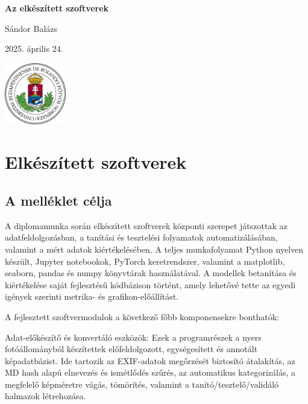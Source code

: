 \documentclass[	
  noindent
]{elteikthesis}[2024/04/26]
\begin{document}

\begin{titlepage}
    \centering
    \vspace*{3cm}
    {\Huge\bfseries Az elkészített szoftverek \par}
    \vspace{2cm}
    {\Large Sándor Balázs\par}
    \vspace{1cm}
    {\large 2025. április 24. \par}
    \vfill
    {\includegraphics[width=0.2\textwidth]{images/elte_cimer_szines.eps}\par}
\end{titlepage}

\tableofcontents

\chapter{Elkészített szoftverek}

    \section{A melléklet célja}
    A diplomamunka során elkészített szoftverek központi szerepet játszottak az adatfeldolgozásban, a tanítási és tesztelési folyamatok automatizálásában, valamint a mért adatok kiértékelésében. A teljes munkafolyamat Python nyelven készült, Jupyter notebookok, PyTorch keretrendszer, valamint a matplotlib, seaborn, pandas és numpy könyvtárak használatával. A modellek betanítása és kiértékelése saját fejlesztésű kódbázison történt, amely lehetővé tette az egyedi igények szerinti metrika- és grafikon-előállítást.

    A fejlesztett szoftvermodulok a következő főbb komponensekre bonthatók:

        Adat-előkészítő és konvertáló eszközök: Ezek a programrészek a nyers fotóállományból készítettek előfeldolgozott, egységesített és annotált képadatbázist. Ide tartozik az EXIF-adatok megőrzését biztosító átalakítás, az MD hash alapú elnevezés és ismétlődés szűrés, az automatikus kategorizálás, a megfelelő képméretre vágás, tömörítés, valamint a tanító/tesztelő/validáló halmazok létrehozása.
\end{document}
